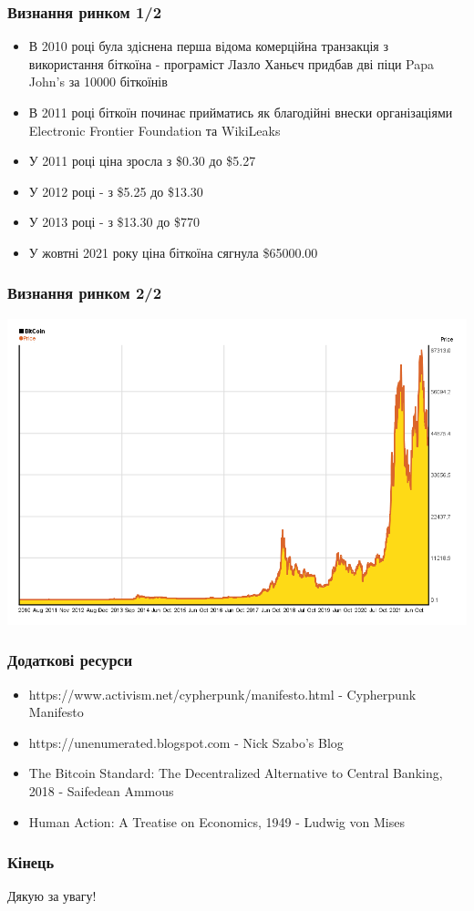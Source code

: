 \documentclass{beamer}
\begin{document}
\begin{frame}
  \frametitle{Визнання ринком 1/2}
  \begin{itemize}
  \item В 2010 році була здіснена перша відома комерційна транзакція з
    використання біткоїна - програміст Лазло Ханьєч придбав дві піци Papa John's
    за 10000 біткоїнів
  \item В 2011 році біткоїн починає прийматись як благодійні внески
    організаціями Electronic Frontier Foundation та WikiLeaks
  \item У 2011 році ціна зросла з \$0.30 до \$5.27
  \item У 2012 році - з \$5.25 до \$13.30
  \item У 2013 році - з \$13.30 до \$770
  \item У жовтні 2021 року ціна біткоїна сягнула \$65000.00
  \end{itemize}
\end{frame}

\begin{frame}[fragile]
  \frametitle{Визнання ринком 2/2}
  \includegraphics[width=\textwidth]{bitcoin-price}
\end{frame}

\begin{frame}
  \frametitle{Додаткові ресурси}
  \begin{itemize}
  \item https://www.activism.net/cypherpunk/manifesto.html - Cypherpunk Manifesto
  \item https://unenumerated.blogspot.com - Nick Szabo's Blog
  \item The Bitcoin Standard: The Decentralized Alternative to Central Banking,
    2018 - Saifedean Ammous
  \item Human Action: A Treatise on Economics, 1949 - Ludwig von Mises
  \end{itemize}
\end{frame}

\begin{frame}
  \frametitle{Кінець}
  \begin{center}
    Дякую за увагу!
  \end{center}
\end{frame}
\end{document}
